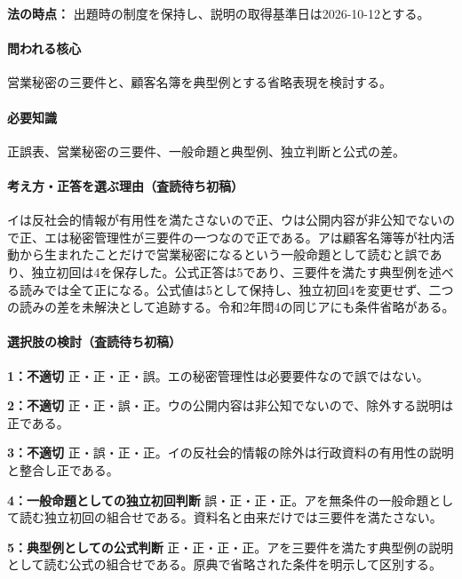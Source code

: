 \noindent\textbf{法の時点：} 出題時の制度を保持し、説明の取得基準日は2026-10-12とする。\par

\paragraph{問われる核心} 営業秘密の三要件と、顧客名簿を典型例とする省略表現を検討する。

\paragraph{必要知識} 正誤表、営業秘密の三要件、一般命題と典型例、独立判断と公式の差。

\paragraph{考え方・正答を選ぶ理由（査読待ち初稿）} イは反社会的情報が有用性を満たさないので正、ウは公開内容が非公知でないので正、エは秘密管理性が三要件の一つなので正である。アは顧客名簿等が社内活動から生まれたことだけで営業秘密になるという一般命題として読むと誤であり、独立初回は4を保存した。公式正答は5であり、三要件を満たす典型例を述べる読みでは全て正になる。公式値は5として保持し、独立初回4を変更せず、二つの読みの差を未解決として追跡する。令和2年問4の同じアにも条件省略がある。

\paragraph{選択肢の検討（査読待ち初稿）}\mbox{}\par

\noindent\textbf{1：不適切} 正・正・正・誤。エの秘密管理性は必要要件なので誤ではない。\par

\noindent\textbf{2：不適切} 正・正・誤・正。ウの公開内容は非公知でないので、除外する説明は正である。\par

\noindent\textbf{3：不適切} 正・誤・正・正。イの反社会的情報の除外は行政資料の有用性の説明と整合し正である。\par

\noindent\textbf{4：一般命題としての独立初回判断} 誤・正・正・正。アを無条件の一般命題として読む独立初回の組合せである。資料名と由来だけでは三要件を満たさない。\par

\noindent\textbf{5：典型例としての公式判断} 正・正・正・正。アを三要件を満たす典型例の説明として読む公式の組合せである。原典で省略された条件を明示して区別する。\par

